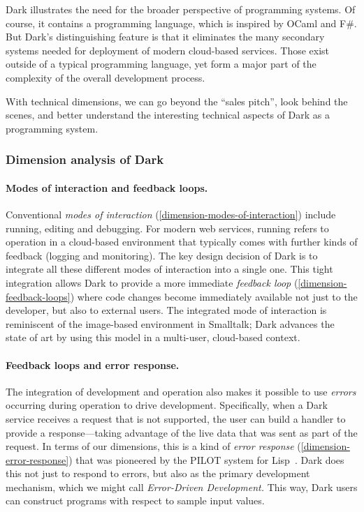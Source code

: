 Dark illustrates the need for the broader perspective of programming
systems. Of course, it contains a programming language, which is
inspired by OCaml and F\#. But Dark's distinguishing feature is that it
eliminates the many secondary systems needed for deployment of modern
cloud-based services. Those exist outside of a typical programming
language, yet form a major part of the complexity of the overall
development process.

With technical dimensions, we can go beyond the ``sales pitch'', look
behind the scenes, and better understand the interesting technical
aspects of Dark as a programming system.

\hypertarget{dimension-analysis-of-dark}{%
\subsubsection{Dimension analysis of
Dark}\label{dimension-analysis-of-dark}}

\paragraph{Modes of interaction and feedback loops.}

Conventional \emph{modes of interaction}
(\ref{dimension-modes-of-interaction}) include running, editing and
debugging. For modern web services, running refers to operation in a
cloud-based environment that typically comes with further kinds of
feedback (logging and monitoring). The key design decision of Dark is to
integrate all these different modes of interaction into a single one.
This tight integration allows Dark to provide a more immediate
\emph{feedback loop} (\ref{dimension-feedback-loops}) where code changes
become immediately available not just to the developer, but also to
external users. The integrated mode of interaction is reminiscent of the
image-based environment in Smalltalk; Dark advances the state of art by
using this model in a multi-user, cloud-based context.

\paragraph{Feedback loops and error response.}

The integration of development and operation also makes it possible to
use \emph{errors} occurring during operation to drive development.
Specifically, when a Dark service receives a request that is not
supported, the user can build a handler to provide a response---taking
advantage of the live data that was sent as part of the request. In
terms of our dimensions, this is a kind of \emph{error response}
(\ref{dimension-error-response}) that was pioneered by the PILOT system
for Lisp~\cite{Pilot}. Dark does this not just to respond to errors, but
also as the primary development mechanism, which we might call
\emph{Error-Driven Development.} This way, Dark users can construct
programs with respect to sample input values.

